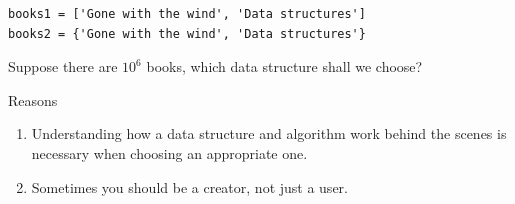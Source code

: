 \documentclass[aspectratio=169, 14pt]{beamer}
\begin{document}
\begin{frame}[fragile]
\begin{verbatim}
books1 = ['Gone with the wind', 'Data structures']
books2 = {'Gone with the wind', 'Data structures'}
\end{verbatim}

Suppose there are $10^6$ books, which data structure shall we choose?

\pause

\begin{block}{Reasons}
    \begin{enumerate}
        \item Understanding how a data structure and algorithm work behind the scenes is necessary when choosing an appropriate one.
        \item Sometimes you should be a creator, not just a user.
    \end{enumerate}
\end{block}
\end{frame}
\end{document}
